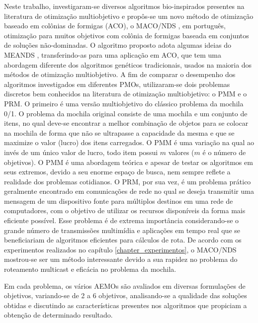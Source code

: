 Neste trabalho, investigaram-se diversos algoritmos bio-inspirados presentes na literatura de otimização multiobjetivo e propôs-se um novo método de otimização baseado em colônias de formigas (ACO), o \ac{MACO/NDS} \cite{Franca2018}, em português, otimização para muitos objetivos com colônia de formigas baseada em conjuntos de soluções não-dominadas. O algoritmo proposto adota algumas ideias do MEANDS \cite{Lafeta2017}, transferindo-as para uma aplicação em ACO, que tem uma abordagem diferente dos algoritmos genéticos tradicionais, usados na maioria dos métodos de otimização multiobjetivo. A fim de comparar o desempenho dos algoritmos investigados em diferentes \acp{PMO}, utilizaram-se dois problemas discretos bem conhecidos na literatura de otimização multiobjetivo: o \ac{PMM} e o \ac{PRM}. O primeiro é uma versão multiobjetivo do clássico problema da mochila 0/1. O problema da mochila original consiste de uma mochila e um conjunto de itens, no qual deve-se encontrar a melhor combinação de objetos para se colocar na mochila de forma que não se ultrapasse a capacidade da mesma e que se maximize o valor (lucro) dos itens carregados. O PMM é uma variação na qual ao invés de um único valor de lucro, todo item possui $m$ valores ($m$ é o número de objetivos). O \ac{PMM} é uma abordagem teórica e apesar de testar os algoritmos em seus extremos, devido a seu enorme espaço de busca, nem sempre reflete a realidade dos problemas cotidianos. O \ac{PRM}, por sua vez, é um problema prático geralmente encontrado em comunicações de rede no qual se deseja transmitir uma mensagem de um dispositivo fonte para múltiplos destinos em uma rede de computadores, com o objetivo de utilizar os recursos disponíveis da forma mais eficiente possível. Esse problema é de extrema importância considerando-se o grande número de transmissões multimídia e aplicações em tempo real que se beneficiariam de algoritmos eficientes para cálculos de rota. De acordo com os experimentos realizados no capítulo \ref{chapter_experimentos}, o MACO/NDS mostrou-se ser um método interessante devido a sua rapidez no problema do roteamento multicast e eficácia no problema da mochila.

Em cada problema, os vários AEMOs são avaliados em diversas formulações de objetivos, variando-se de 2 a 6 objetivos, analisando-se a qualidade das soluções obtidas e discutindo as características presentes nos algoritmos que propiciam a obtenção de determinado resultado. 

